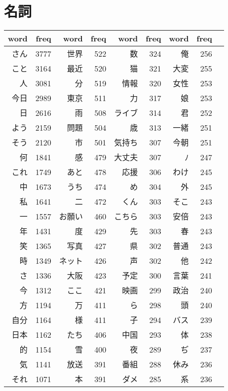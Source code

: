 \section{名詞}
\begin{longtable}{rrrrrrrrr}
\hline
word & freq & word & freq & word & freq & word & freq \\
\hline\endhead\hline\endfoot
さん & 3777 & 世界 & 522 & 数 & 324 & 俺 & 256 \\
こと & 3164 & 最近 & 520 & 猫 & 321 & 大変 & 255 \\
人 & 3081 & 分 & 519 & 情報 & 320 & 女性 & 253 \\
今日 & 2989 & 東京 & 511 & 力 & 317 & 娘 & 253 \\
日 & 2616 & 雨 & 508 & ライブ & 314 & 君 & 252 \\
よう & 2159 & 問題 & 504 & 歳 & 313 & 一緒 & 251 \\
そう & 2120 & 市 & 501 & 気持ち & 307 & 今朝 & 251 \\
何 & 1841 & 感 & 479 & 大丈夫 & 307 & ﾉ & 247 \\
これ & 1749 & あと & 478 & 応援 & 306 & わけ & 245 \\
中 & 1673 & うち & 474 & め & 304 & 外 & 245 \\
私 & 1641 & 二 & 472 & くん & 303 & そこ & 243 \\
一 & 1557 & お願い & 460 & こちら & 303 & 安倍 & 243 \\
年 & 1431 & 度 & 429 & 先 & 303 & 春 & 243 \\
笑 & 1365 & 写真 & 427 & 県 & 302 & 普通 & 243 \\
時 & 1349 & ネット & 426 & 声 & 302 & 他 & 242 \\
さ & 1336 & 大阪 & 423 & 予定 & 300 & 言葉 & 241 \\
今 & 1312 & ここ & 421 & 映画 & 299 & 政治 & 240 \\
方 & 1194 & 万 & 411 & ら & 298 & 頭 & 240 \\
自分 & 1164 & 様 & 411 & 子 & 294 & バス & 239 \\
日本 & 1162 & たち & 406 & 中国 & 293 & 体 & 238 \\
的 & 1154 & 雪 & 400 & 夜 & 289 & ぢ & 237 \\
気 & 1141 & 放送 & 391 & 番組 & 288 & 休み & 236 \\
それ & 1071 & 本 & 391 & ダメ & 285 & 系 & 236 \\

\end{longtable}
